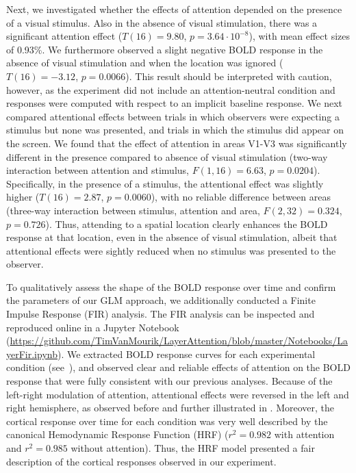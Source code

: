 \documentclass[9pt,lineno]{aperture}
\begin{document}
Next, we investigated whether the effects of attention depended on the presence of a visual stimulus. Also in the absence of visual stimulation, there was a significant attention effect ($T(16)=9.80$, $p=3.64 \cdot 10^{-8}$), with mean effect sizes of 0.93\%. We furthermore observed a slight negative BOLD response in the absence of visual stimulation and when the location was ignored ($T(16)=-3.12$, $p=0.0066$). This result should be interpreted with caution, however, as the experiment did not include an attention-neutral condition and responses were computed with respect to an implicit baseline response. We next compared attentional effects between trials in which observers were expecting a stimulus but none was presented, and trials in which the stimulus did appear on the screen. We found that the effect of attention in areas V1-V3 was significantly different in the presence compared to absence of visual stimulation (two-way interaction between attention and stimulus, $F(1,16)=6.63$, $p=0.0204$). Specifically, in the presence of a stimulus, the attentional effect was slightly higher ($T(16)=2.87$, $p=0.0060$), with no reliable difference between areas (three-way interaction between stimulus, attention and area, $F(2,32)=0.324$, $p=0.726$). Thus, attending to a spatial location clearly enhances the BOLD response at that location, even in the absence of visual stimulation, albeit that attentional effects were sightly reduced when no stimulus was presented to the observer.


To  qualitatively assess the shape of the BOLD response over time and confirm the parameters of our GLM approach, we additionally conducted a Finite Impulse Response (FIR) analysis. The FIR analysis can be inspected and reproduced online in a Jupyter Notebook (\url{https://github.com/TimVanMourik/LayerAttention/blob/master/Notebooks/LayerFir.ipynb}). We extracted BOLD response curves for each experimental condition (see~), and observed clear and reliable effects of attention on the BOLD response that were fully consistent with our previous analyses. Because of the left-right modulation of attention, attentional effects were reversed in the left and right hemisphere, as observed before and further illustrated in . Moreover, the cortical response over time for each condition was very well described by the canonical Hemodynamic Response Function (HRF) ($r^2=0.982$ with attention and $r^2=0.985$ without attention). Thus, the HRF model presented a fair description of the cortical responses observed in our experiment. 
\end{document}

